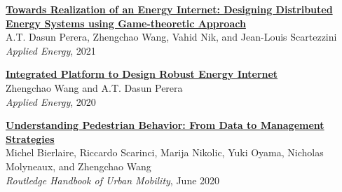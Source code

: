 \documentclass[letterpaper,11pt]{article}
\begin{document}
\begin{myitemize}
	\item \href{https://doi.org/10.1016/j.apenergy.2020.116349}{\bf  Towards Realization
of an Energy Internet: Designing Distributed Energy Systems using Game-theoretic Approach}\\{A.T. Dasun Perera, Zhengchao Wang, Vahid Nik,  and Jean-Louis Scartezzini}\\ {{\it Applied Energy},  2021}
	\item \href{https://doi.org/10.1016/j.apenergy.2020.114942}{\bf  Integrated Platform to Design Robust Energy Internet}\\{Zhengchao Wang and A.T. Dasun Perera}\\ {{\it Applied Energy},  2020}
	\item \href{https://doi.org/10.4324/9781351058759}{\bf Understanding Pedestrian Behavior: From Data to Management Strategies}\\ {Michel Bierlaire,  Riccardo Scarinci, Marija Nikolic, Yuki Oyama, Nicholas Molyneaux, and Zhengchao Wang}\\ {{\it Routledge Handbook of Urban Mobility},  June 2020}
\end{myitemize}
\end{document}
